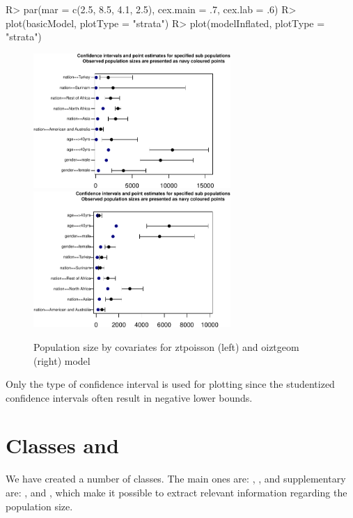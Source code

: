 \documentclass[
]{jss}
\newcommand{\1}{\mathcal{I}} \newcommand{\bZero}{\boldsymbol{0}}
\begin{document}
\begin{CodeChunk}
\begin{CodeInput}
R> par(mar = c(2.5, 8.5, 4.1, 2.5), cex.main = .7, cex.lab = .6)
R> plot(basicModel, plotType = "strata")
R> plot(modelInflated, plotType = "strata")
\end{CodeInput}
\begin{figure}[ht]

{\centering \includegraphics[width=7.5cm]{singleRcapture_files/figure-latex/strata_plot-1} \includegraphics[width=7.5cm]{singleRcapture_files/figure-latex/strata_plot-2} 

}

\caption[Population size by covariates for ztpoisson (left) and oiztgeom (right) model]{Population size by covariates for ztpoisson (left) and oiztgeom (right) model}\label{fig:strata_plot}
\end{figure}
\end{CodeChunk}

Only the  type of confidence interval is used for
plotting since the studentized confidence intervals often result in
negative lower bounds.

\section[Classes and S3Methods]{Classes and }\label{sec-methods}

We have created a number of classes. The main ones are:
, , and supplementary
are: ,  and
\newline {}, which make it possible to
extract relevant information regarding the population size.
\end{document}
